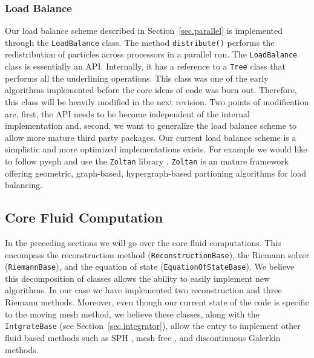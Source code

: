 \subsubsection{Load Balance}
Our load balance scheme described in Section~\ref{sec.parallel} is implemented through the 
\lstinline{LoadBalance} class. The method \lstinline{distribute()} performs the redistribution of particles 
across processors in a parallel run. The \lstinline{LoadBalance} class is essentially an API.
Internally, it has a reference to a \lstinline{Tree} class that performs all the underlining operations. This 
class was one of the early algorithms implemented before the core ideas of code was born out. Therefore, this 
class will be heavily modified in the next revision. Two points of modification are, first, the API  needs to 
be become independent of the internal implementation and, second, we want to generalize the load balance 
scheme to allow more mature third party packages. Our current load balance scheme is a simplistic and more 
optimized implementations exists. For example we would like to follow pysph and use the \texttt{Zoltan} 
library \citep{Devine2000}. \texttt{Zoltan} is an mature framework offering geometric, graph-based, 
hypergraph-based partioning algorithms for load balancing.


\subsection{Core Fluid Computation}
In the preceding sections we will go over the core fluid computations. This encompass the
reconstruction method (\lstinline{ReconstructionBase}), the Riemann solver (\lstinline{RiemannBase}),
and the equation of state (\lstinline{EquationOfStateBase}).
We believe this decomposition of classes allows the ability to easily implement new algorithms. In
our case we have implemented two reconstruction and three Riemann methods. Moreover, even though our
current state of the code is specific to the moving mesh method, we believe these classes, along with the
\lstinline{IntgrateBase} (see Section~\ref{sec.integrator}), allow the entry to implement other fluid based 
methods such as SPH \citep{Gingold1977}, mesh free \citep{Hopkins2015}, and discontinuous 
Galerkin \citep{Mocz2014} methods.

